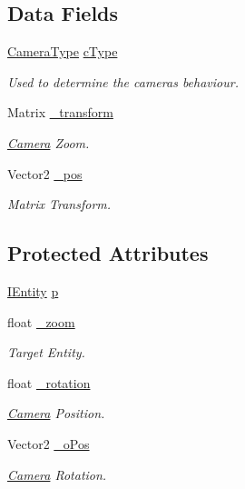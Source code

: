 \subsection*{Data Fields}
\begin{DoxyCompactItemize}
\item 
\hyperlink{a00267_aa40b88e1e953e36c54409ee9727c238b}{Camera\+Type} \hyperlink{a00490_a4394e674c32e8e3ca1b1fd25bc4277d4}{c\+Type}
\begin{DoxyCompactList}\small\item\em Used to determine the cameras behaviour. \end{DoxyCompactList}\item 
Matrix \hyperlink{a00490_a6760aa08917104a4c2937a9a7e05fe18}{\+\_\+transform}
\begin{DoxyCompactList}\small\item\em \hyperlink{a00490}{Camera} Zoom. \end{DoxyCompactList}\item 
Vector2 \hyperlink{a00490_a7b8a69cbcec7b5b8a463981970823b51}{\+\_\+pos}
\begin{DoxyCompactList}\small\item\em Matrix Transform. \end{DoxyCompactList}\end{DoxyCompactItemize}
\subsection*{Protected Attributes}
\begin{DoxyCompactItemize}
\item 
\hyperlink{a00438}{I\+Entity} \hyperlink{a00490_a2805d6ca57bb0d53772646539bb5fb71}{p}
\item 
float \hyperlink{a00490_a3909ab890f8c56d831d892bb6f6d4a20}{\+\_\+zoom}
\begin{DoxyCompactList}\small\item\em Target Entity. \end{DoxyCompactList}\item 
float \hyperlink{a00490_a34f440a1a9a332a065c4e022130d32dd}{\+\_\+rotation}
\begin{DoxyCompactList}\small\item\em \hyperlink{a00490}{Camera} Position. \end{DoxyCompactList}\item 
Vector2 \hyperlink{a00490_a44c44f9b99889984004062844ccbb23a}{\+\_\+o\+Pos}
\begin{DoxyCompactList}\small\item\em \hyperlink{a00490}{Camera} Rotation. \end{DoxyCompactList}\end{DoxyCompactItemize}

